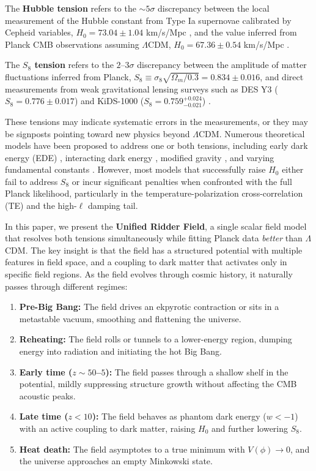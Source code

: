 \documentclass[twocolumn,showpacs,preprintnumbers,amsmath,amssymb,prd]{revtex4-2}
\begin{document}
The \textbf{Hubble tension} refers to the $\sim 5\sigma$ discrepancy between the local measurement of the Hubble constant from Type Ia supernovae calibrated by Cepheid variables, $H_0 = 73.04 \pm 1.04$ km/s/Mpc \cite{Riess2022}, and the value inferred from Planck CMB observations assuming $\Lambda$CDM, $H_0 = 67.36 \pm 0.54$ km/s/Mpc \cite{Planck2018}.

The \textbf{$S_8$ tension} refers to the $2$--$3\sigma$ discrepancy between the amplitude of matter fluctuations inferred from Planck, $S_8 \equiv \sigma_8\sqrt{\Omega_m/0.3} = 0.834 \pm 0.016$, and direct measurements from weak gravitational lensing surveys such as DES Y3 ($S_8 = 0.776 \pm 0.017$) \cite{DES2022} and KiDS-1000 ($S_8 = 0.759^{+0.024}_{-0.021}$) \cite{KiDS2021}.

These tensions may indicate systematic errors in the measurements, or they may be signposts pointing toward new physics beyond $\Lambda$CDM. Numerous theoretical models have been proposed to address one or both tensions, including early dark energy (EDE) \cite{Poulin2019,Smith2020}, interacting dark energy \cite{DiValentino2020}, modified gravity \cite{Clifton2012}, and varying fundamental constants \cite{Hart2020}. However, most models that successfully raise $H_0$ either fail to address $S_8$ or incur significant penalties when confronted with the full Planck likelihood, particularly in the temperature-polarization cross-correlation (TE) and the high-$\ell$ damping tail.

In this paper, we present the \textbf{Unified Ridder Field}, a single scalar field model that resolves both tensions simultaneously while fitting Planck data \textit{better} than $\Lambda$CDM. The key insight is that the field has a structured potential with multiple features in field space, and a coupling to dark matter that activates only in specific field regions. As the field evolves through cosmic history, it naturally passes through different regimes:

\begin{enumerate}
    \item \textbf{Pre-Big Bang:} The field drives an ekpyrotic contraction or sits in a metastable vacuum, smoothing and flattening the universe.
    \item \textbf{Reheating:} The field rolls or tunnels to a lower-energy region, dumping energy into radiation and initiating the hot Big Bang.
    \item \textbf{Early time ($z \sim 50$--$5$):} The field passes through a shallow shelf in the potential, mildly suppressing structure growth without affecting the CMB acoustic peaks.
    \item \textbf{Late time ($z < 10$):} The field behaves as phantom dark energy ($w < -1$) with an active coupling to dark matter, raising $H_0$ and further lowering $S_8$.
    \item \textbf{Heat death:} The field asymptotes to a true minimum with $V(\phi) \to 0$, and the universe approaches an empty Minkowski state.
\end{enumerate}
\end{document}
